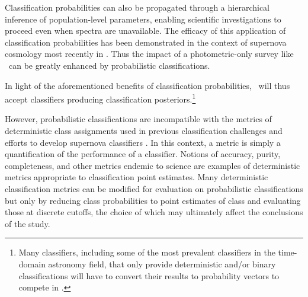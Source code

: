 Classification probabilities can also be propagated through a hierarchical inference of population-level parameters, enabling scientific investigations to proceed even when spectra are unavailable.
The efficacy of this application of classification probabilities has been demonstrated in the context of supernova cosmology most recently in \citep{roberts_zbeams:_2017}.
Thus the impact of a photometric-only survey like \lsst\ can be greatly enhanced by probabilistic classifications.

In light of the aforementioned benefits of classification probabilities, \plasticc\ will thus accept classifiers producing classification posteriors.\footnote{Many classifiers, including some of the most prevalent classifiers in the time-domain astronomy field, that only provide deterministic and/or binary classifications will have to convert their results to probability vectors to compete in \plasticc.}

However, probabilistic classifications are incompatible with the metrics of deterministic class assignments used in previous classification challenges \citep{kessler_supernova_2010, kessler_results_2010} and efforts to develop supernova classifiers \citep{narayan_machine_2018}.
In this context, a metric is simply a quantification of the performance of a classifier.
Notions of accuracy, purity, completeness, and other metrics endemic to science are examples of deterministic metrics appropriate to classification point estimates.
Many deterministic classification metrics can be modified for evaluation on probabilistic classifications \citep{lochner_photometric_2016, moller_photometric_2016, hon_deep_2017, hon_detecting_2018, gieseke_detecting_2010} but only by reducing class probabilities to point estimates of class and evaluating those at discrete cutoffs, the choice of which may ultimately affect the conclusions of the study.

